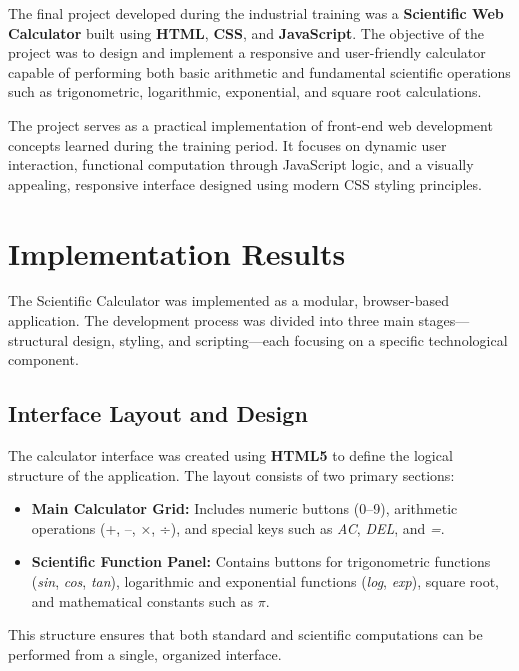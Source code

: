 \documentclass[a4paper,12pt,oneside]{report}
\numberwithin{equation}{chapter}
\numberwithin{figure}{chapter}
\numberwithin{table}{chapter}
\begin{document}
The final project developed during the industrial training was a \textbf{Scientific Web Calculator} built using \textbf{HTML}, \textbf{CSS}, and \textbf{JavaScript}. The objective of the project was to design and implement a responsive and user-friendly calculator capable of performing both basic arithmetic and fundamental scientific operations such as trigonometric, logarithmic, exponential, and square root calculations.

The project serves as a practical implementation of front-end web development concepts learned during the training period. It focuses on dynamic user interaction, functional computation through JavaScript logic, and a visually appealing, responsive interface designed using modern CSS styling principles.

\bigskip
\noindent
\section{Implementation Results}

The Scientific Calculator was implemented as a modular, browser-based application. The development process was divided into three main stages—structural design, styling, and scripting—each focusing on a specific technological component.

\bigskip
\noindent
\subsection{Interface Layout and Design}

The calculator interface was created using \textbf{HTML5} to define the logical structure of the application. The layout consists of two primary sections:
\begin{itemize}
    \item \textbf{Main Calculator Grid:} Includes numeric buttons (0–9), arithmetic operations (+, –, ×, ÷), and special keys such as \textit{AC}, \textit{DEL}, and \textit{=}.
    \item \textbf{Scientific Function Panel:} Contains buttons for trigonometric functions (\textit{sin}, \textit{cos}, \textit{tan}), logarithmic and exponential functions (\textit{log}, \textit{exp}), square root, and mathematical constants such as \textit{$\pi$}.
\end{itemize}

This structure ensures that both standard and scientific computations can be performed from a single, organized interface.

\bigskip
\noindent
\end{document}
